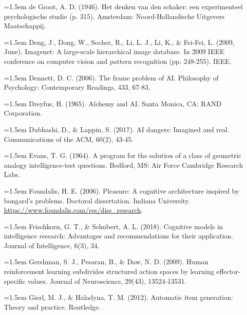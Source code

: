 \hangindent=1.5em
de Groot, A. D. (1946).
Het denken van den schaker: een experimenteel psychologische studie
(p. 315).
Amsterdam: Noord-Hollandische Uitgevers Maatschappij.
\par

\hangindent=1.5em
Deng, J., Dong, W., Socher, R., Li, L. J., Li, K.,
\& Fei-Fei, L. (2009, June).
Imagenet: A large-scale hierarchical image database.
In 2009 IEEE conference on computer vision and pattern recognition
(pp. 248-255).
IEEE.
\par

\hangindent=1.5em
Dennett, D. C. (2006).
The frame problem of AI.
Philosophy of Psychology: Contemporary Readings, 433, 67-83.
\par

\hangindent=1.5em
Dreyfus, H. (1965).
Alchemy and AI.
Santa Monica, CA: RAND Corporation.
\par

\hangindent=1.5em
Dubhashi, D., \& Lappin, S. (2017).
AI dangers: Imagined and real.
Communications of the ACM, 60(2), 43-45.
\par

\hangindent=1.5em
Evans, T. G. (1964).
A program for the solution of a class of geometric analogy
intelligence-test questions.
Bedford, MS: Air Force Cambridge Research Labs.
\par

\hangindent=1.5em
Foundalis, H. E. (2006).
Pleasure: A cognitive architecture inspired by bongard's problems.
Doctoral dissertation.
Indiana University.
\url{https://www.foundalis.com/res/diss_research}.
\par

\hangindent=1.5em
Frischkorn, G. T., \& Schubert, A. L. (2018).
Cognitive models in intelligence research: Advantages and
recommendations for their application.
Journal of Intelligence, 6(3), 34.
\par

\hangindent=1.5em
Gershman, S. J., Pesaran, B., \& Daw, N. D. (2009).
Human reinforcement learning subdivides structured action spaces
by learning effector-specific values.
Journal of Neuroscience, 29(43), 13524-13531.
\par

\hangindent=1.5em
Gierl, M. J., \& Haladyna, T. M. (2012).
Automatic item generation: Theory and practice.
Routledge.
\par

